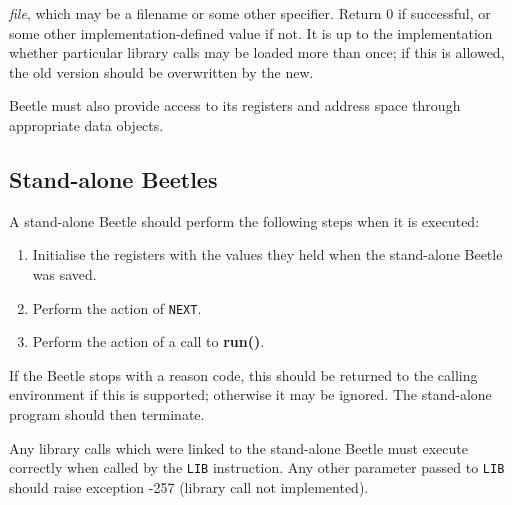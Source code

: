 \begin{description}
{    \textit{file}, which may be a filename or some other specifier. Return 0 if
    successful, or some other implementation-defined value if not. It is up
    to the implementation whether particular library calls may be loaded
    more than once; if this is allowed, the old version should be
    overwritten by the new.}
\end{description}

Beetle must also provide access to its registers and address space through
appropriate data objects.


\subsection{Stand-alone Beetles}
\label{standalone}

A stand-alone Beetle should perform the following steps when it is executed:

\begin{enumerate}
\item Initialise the registers with the values they held when the
    stand-alone Beetle was saved.
\item Perform the action of {\tt NEXT}.
\item Perform the action of a call to {\bf run()}.
\end{enumerate}

If the Beetle stops with a reason code, this should be returned to the calling
environment if this is supported; otherwise it may be ignored. The stand-alone
program should then terminate.

Any library calls which were linked to the stand-alone Beetle must execute
correctly when called by the {\tt LIB} instruction. Any other parameter passed
to {\tt LIB} should raise exception -257 (library call not implemented).



